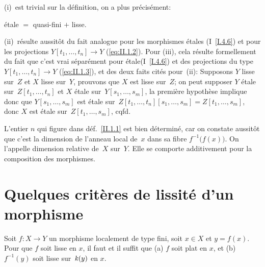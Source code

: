 (i)~est trivial sur la d\'efinition, on a plus pr\'ecis\'ement:

\begin{corollaire}
\label{II.1.4}
\'etale $=$ quasi-fini $+$ lisse.
\end{corollaire}

(ii)~r\'esulte aussit\^ot du fait analogue pour les morphismes
\'etales (I~\ref{I.4.6}) et pour les projections $Y[t_1,\dots,t_n]
\to Y$ (\cf \eqref{eq:II.1.2}). Pour (iii), cela r\'esulte
formellement du fait que c'est vrai s\'epar\'ement pour
\og \'etale\fg (I~\ref{I.4.6}) et des projections du type
$Y[t_1,\dots,t_n]\to Y$
(\cf \eqref{eq:II.1.3}), et des deux faits cit\'es pour~(ii):
Supposons $Y$ lisse sur~$Z$ et $X$ lisse sur~$Y$, prouvons que $X$ est
lisse sur~$Z$; on peut supposer $Y$ \'etale sur~$Z[t_1,\dots,t_n]$
et $X$ \'etale sur~$Y[s_1,\dots,s_m]$, la premi\`ere
hypoth\`ese implique donc que $Y[s_1,\dots,s_m]$ est \'etale sur~$Z[t_1,\dots,t_n][s_1,\dots,s_m] = Z[t_1,\dots,s_m]$, donc $X$ est
\'etale sur~$Z[t_1,\dots,s_m]$, cqfd.

\begin{remarque}
\label{II.1.5}
L'entier $n$ qui figure dans d\'ef.\, \ref{II.1.1} est bien
d\'etermin\'e, car on constate
aussit\^ot que c'est la dimension de l'anneau local de~$x$ dans sa
fibre $f^{-1}\big(f(x)\big)$. On l'appelle \og dimension relative\fg
de~$X$ sur~$Y$. Elle se comporte additivement pour la composition des
morphismes.
\end{remarque}

\section{Quelques crit\`eres de lissit\'e d'un morphisme}
\label{II.2}

\begin{theoreme}
\label{II.2.1}
Soit $f\colon X\to Y$ un morphisme localement de type fini, soit $x\in
X$ et $y=f(x)$. Pour que $f$ soit lisse en $x$, il faut et il suffit
que \textup{(a)} $f$ soit plat en $x$, et \textup{(b)} $f^{-1}(y)$ soit lisse sur~$\mathit{k}(y)$
en $x$.
\end{theoreme}

